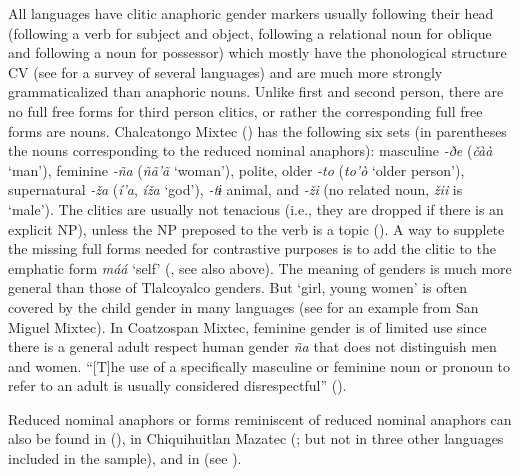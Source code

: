 \documentclass[output=collectionpaper]{langsci/langscibook}
\begin{document}
All  languages have clitic anaphoric gender markers usually following their head (following a verb for subject and object, following a relational noun for oblique and following a noun for possessor) which mostly have the phonological structure CV (see \citealt{Macri1983} for a survey of several  languages) and are much more strongly grammaticalized than  anaphoric nouns. Unlike first and second person, there are no full free forms for third person clitics, or rather the corresponding full free forms are nouns. Chalcatongo Mixtec (\citealt[139]{Macaulay1996}) has the following six sets (in parentheses the nouns corresponding to the reduced nominal anaphors): masculine \textit{-ðe} (\textit{čàà} ‘man’), feminine \textit{-ña} (\textit{ñã’ã} ‘woman’), polite, older \textit{-to} (\textit{to’ò} ‘older person’), supernatural \textit{-ža} (\textit{í’a}, \textit{íža} ‘god’), \textit{-tɨ} animal, and \textit{-ži} (no related noun, \textit{žii} is ‘male’). The clitics are usually not tenacious (i.e., they are dropped if there is an explicit NP), unless the NP preposed to the verb is a topic (\citealt[140]{Macaulay1996}). A way to supplete the missing full forms needed for contrastive purposes is to add the clitic to the emphatic form \textit{máá} ‘self’ (\citealt[106]{Macaulay1996}, see also  above). The meaning of  genders is much more general than those of Tlalcoyalco  genders. But ‘girl, young women’ is often covered by the child gender in many  languages (see  for an example from San Miguel Mixtec). In Coatzospan Mixtec, feminine gender is of limited use since there is a general adult respect human gender \textit{ña} that does not distinguish men and women. “[T]he use of a specifically masculine or feminine noun or pronoun to refer to an adult is usually considered disrespectful” (\citealt[406]{Small1990}).

Reduced nominal anaphors or forms reminiscent of reduced nominal anaphors can also be found in  (\citealt{Bradley1991}), in Chiquihuitlan Mazatec (\citealt{Capen1996}; but not in three other  languages included in the sample), and in  (see ).
\end{document}
